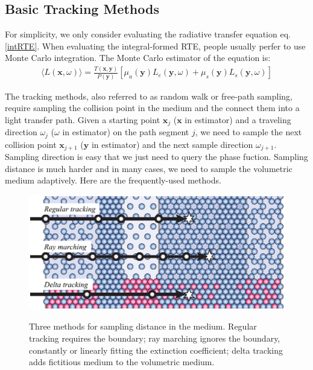 \documentclass[acmtog]{acmart}
\begin{document}
\subsection{Basic Tracking Methods}
For simplicity, we only consider evaluating the radiative transfer equation eq.\eqref{intRTE}.
When evaluating the integral-formed RTE, people usually perfer to use Monte Carlo integration.
The Monte Carlo estimator of the equation is:
\begin{equation}
	\begin{aligned}
		\langle L(\mathbf x, \omega)\rangle=\frac{T(\mathbf x, \mathbf y)}{P(\mathbf y)}\left[\mu_a(\mathbf y)L_e(\mathbf y, \omega)+\mu_s(\mathbf y)L_s(\mathbf y, \omega)\right]
	\end{aligned}
\end{equation}

The tracking methods, also referred to as random walk or free-path sampling, require sampling the collision point in the medium and the connect them into a light transfer path.
Given a starting point $\mathbf x_{j}$ ($\mathbf x$ in estimator) and a traveling direction $\omega_{j}$ ($\omega$ in estimator) on the path segment $j$, we need to sample the next collision point $\mathbf x_{j+1}$ ($\mathbf y$ in estimator) and the next sample direction $\omega_{j+1}$.
Sampling direction is easy that we just need to query the phase fuction.
Sampling distance is much harder and in many cases, we need to sample the volumetric medium adaptively.
Here are the frequently-used methods.

\begin{figure}[htbp]
	\includegraphics[width=\linewidth]{figure/tracking.png}
	\label{tracking}
	\caption{
		Three methods for sampling distance in the medium.
		Regular tracking requires the boundary;
		ray marching ignores the boundary, constantly or linearly fitting the extinction coefficient;
		delta tracking adds fictitious medium to the volumetric medium.
	}
\end{figure}
\end{document}

